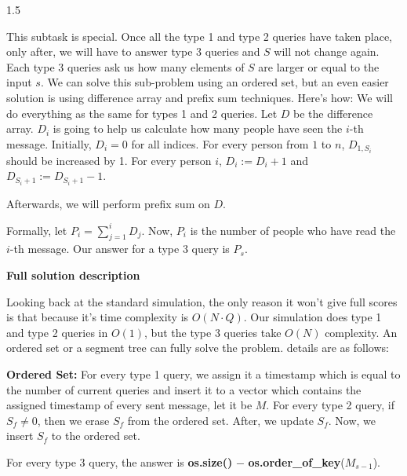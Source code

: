 \documentclass[12pt]{article}
\begin{document}
\begin{spacing}{1.5}
\vspace{0.3cm}

{\large This subtask is special. Once all the type 1 and type 2 queries have taken place, only after, we will have to answer type 3 queries and $S$ will not change again. Each type 3 queries ask us how many elements of $S$ are larger or equal to the input $s$. We can solve this sub-problem using an ordered set, but an even easier solution is using difference array and prefix sum techniques. Here's how: We will do everything as the same for types 1 and 2 queries. Let $D$ be the difference array. $D_i$ is going to help us calculate how many people have seen the $i$-th message. Initially, $D_i = 0$ for all indices. For every person from $1$ to $n$, $D_{1,S_i}$ should be increased by 1. For every person $i$, $D_i := D_i + 1$ and $D_{S_i+1} := D_{S_i+1} - 1$.}


{\large Afterwards, we will perform prefix sum on $D$.}

\vspace{0.1cm}

{\large Formally, let 
$P_i = \sum_{j=1}^{i} D_j$.
Now, $P_i$ is the number of people who have read the $i$-th message. Our answer for a type 3 query is $P_s$.}

\vspace{0.5cm}

\textbf{\Large Full solution description}

\vspace{0.3cm}

{\large Looking back at the standard simulation, the only reason it won't give full scores is that because it's time complexity is $O(N \cdot Q)$. Our simulation does type 1 and type 2 queries in $O(1)$, but the type 3 queries take $O(N)$ complexity. An ordered set or a segment tree can fully solve the problem. details are as follows:}

\newpage

{\large \textbf{Ordered Set:} For every type 1 query, we assign it a timestamp which is equal to the number of current queries and insert it to a vector which contains the assigned timestamp of every sent message, let it be $M$. For every type 2 query, if $S_f \neq 0$, then we erase $S_f$ from the ordered set. After, we update $S_f$. Now, we insert $S_f$ to the ordered set.}

\vspace{0.1cm}

{\large For every type 3 query, the answer is \textbf{os.size()} $-$ \textbf{os.order\_of\_key}($M_{s-1}$).}


\end{spacing}
\end{document}
